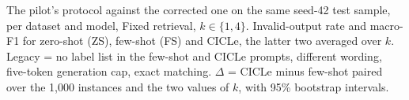 \begin{table}[t]
  \centering
  \scriptsize
  \setlength{\tabcolsep}{3pt}
  \resizebox{\textwidth}{!}{}
  \caption{The pilot's protocol against the corrected one on the same seed-42 test sample, per dataset and model, Fixed retrieval, $k \in \{1, 4\}$. Invalid-output rate and macro-F1 for zero-shot (ZS), few-shot (FS) and CICLe, the latter two averaged over $k$. Legacy = no label list in the few-shot and CICLe prompts, different wording, five-token generation cap, exact matching. $\Delta$ = CICLe minus few-shot paired over the 1,000 instances and the two values of $k$, with 95\% bootstrap intervals.}
  \label{tab:legacy}
\end{table}
